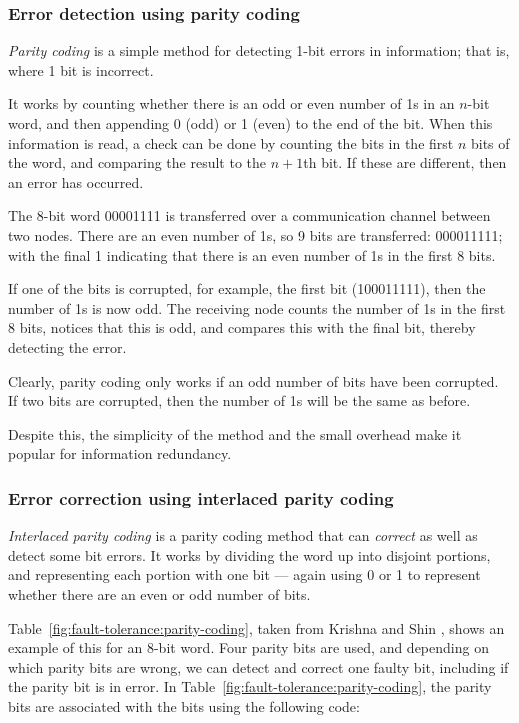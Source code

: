\subsubsection*{Error detection using parity coding}

{\em Parity coding} is a simple method for detecting 1-bit errors in information; that is, where 1 bit is incorrect.

It works by counting whether there is an odd or even number of 1s in an \(n\)-bit word, and then appending 0 (odd) or 1 (even) to the end of the bit. When this information is read, a check can be done by counting the bits in the first \(n\) bits of the word, and comparing the result to the \(n+1\)th bit. If these are different, then an error has occurred.

\begin{example}
The 8-bit word 00001111 is transferred over a communication channel between two nodes. There are an even number of 1s, so 9 bits are transferred: 000011111; with the final 1 indicating that there is an even number of 1s in the first 8 bits.

If one of the bits is corrupted, for example, the first bit (100011111), then the number of 1s is now odd. The receiving node counts the number of 1s in the first 8 bits, notices that this is odd, and compares this with the final bit, thereby detecting the error.

\end{example}

Clearly, parity coding only works if an odd number of bits have been corrupted. If two bits are corrupted, then the number of 1s will be the same as before.

Despite this, the simplicity of the method and the small overhead make it popular for information redundancy.

\subsubsection*{Error correction using interlaced parity coding}

\emph{Interlaced parity coding} is a parity coding method that can \emph{correct} as well as detect some bit errors. It works by dividing the word up into disjoint portions, and representing each portion with one bit --- again using 0 or 1 to represent whether there are an even or odd number of bits.

Table~\ref{fig:fault-tolerance:parity-coding}, taken from Krishna and Shin \cite{krishna99}, shows an example of this for an 8-bit word. Four parity bits are used, and depending on which parity bits are wrong, we can detect and correct one faulty bit, including if the parity bit is in error. In Table~\ref{fig:fault-tolerance:parity-coding}, the parity bits are associated with the bits using the following code:


